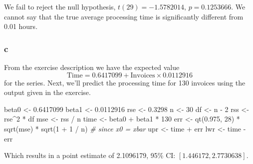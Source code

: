 \documentclass[
]{article}
\newenvironment{Shaded}{\begin{snugshade}}{\end{snugshade}}
\newcommand{\CommentTok}[1]{\textcolor[rgb]{0.56,0.35,0.01}{\textit{#1}}}
\newcommand{\DecValTok}[1]{\textcolor[rgb]{0.00,0.00,0.81}{#1}}
\newcommand{\FloatTok}[1]{\textcolor[rgb]{0.00,0.00,0.81}{#1}}
\newcommand{\FunctionTok}[1]{\textcolor[rgb]{0.00,0.00,0.00}{#1}}
\newcommand{\NormalTok}[1]{#1}
\newcommand{\OtherTok}[1]{\textcolor[rgb]{0.56,0.35,0.01}{#1}}
\newcommand{\SpecialCharTok}[1]{\textcolor[rgb]{0.00,0.00,0.00}{#1}}
\begin{document}
We fail to reject the null hypothesis, \(t(29) = -1.5782014\),
\(p=0.1253666\). We cannot say that the true average processing time is
significantly different from 0.01 hours.

\hypertarget{c-1}{%
\subsubsection*{c}\label{c-1}}

From the exercise description we have the expected value \[
\text{Time} = 0.6417099+\text{Invoices}\times 0.0112916
\] for the series. Next, we'll predict the processing time for 130
invoices using the output given in the exercise.

\begin{Shaded}
\begin{Highlighting}[]
\NormalTok{beta0 }\OtherTok{\textless{}{-}} \FloatTok{0.6417099}
\NormalTok{beta1 }\OtherTok{\textless{}{-}} \FloatTok{0.0112916}
\NormalTok{rse }\OtherTok{\textless{}{-}} \FloatTok{0.3298}
\NormalTok{n }\OtherTok{\textless{}{-}} \DecValTok{30}
\NormalTok{df }\OtherTok{\textless{}{-}}\NormalTok{ n }\SpecialCharTok{{-}} \DecValTok{2}
\NormalTok{rss }\OtherTok{\textless{}{-}}\NormalTok{ rse}\SpecialCharTok{\^{}}\DecValTok{2} \SpecialCharTok{*}\NormalTok{ df}
\NormalTok{mse }\OtherTok{\textless{}{-}}\NormalTok{ rss }\SpecialCharTok{/}\NormalTok{ n }
\NormalTok{time }\OtherTok{\textless{}{-}}\NormalTok{ beta0 }\SpecialCharTok{+}\NormalTok{ beta1 }\SpecialCharTok{*} \DecValTok{130}
\NormalTok{err }\OtherTok{\textless{}{-}} \FunctionTok{qt}\NormalTok{(}\FloatTok{0.975}\NormalTok{, }\DecValTok{28}\NormalTok{) }\SpecialCharTok{*} \FunctionTok{sqrt}\NormalTok{(mse) }\SpecialCharTok{*} \FunctionTok{sqrt}\NormalTok{(}\DecValTok{1} \SpecialCharTok{+} \DecValTok{1} \SpecialCharTok{/}\NormalTok{ n) }\CommentTok{\# since x0 = xbar}
\NormalTok{upr }\OtherTok{\textless{}{-}}\NormalTok{ time }\SpecialCharTok{+}\NormalTok{ err}
\NormalTok{lwr }\OtherTok{\textless{}{-}}\NormalTok{ time }\SpecialCharTok{{-}}\NormalTok{ err}
\end{Highlighting}
\end{Shaded}

Which results in a point estimate of 2.1096179, 95\% CI:
\([1.446172, 2.7730638]\).
\end{document}
